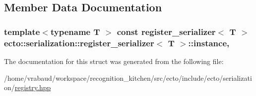 \subsection{Member Data Documentation}
\hypertarget{structecto_1_1serialization_1_1register__serializer_a742ed82697621237f599631009e47e05}{}
\subsubsection[{instance}]{\setlength{\rightskip}{0pt plus 5cm}template$<$typename T $>$ const {\bf register\+\_\+serializer}$<$ T $>$ {\bf ecto\+::serialization\+::register\+\_\+serializer}$<$ T $>$\+::instance\hspace{0.3cm}{\ttfamily [static]}, {\ttfamily [private]}}\label{structecto_1_1serialization_1_1register__serializer_a742ed82697621237f599631009e47e05}


The documentation for this struct was generated from the following file\+:\begin{DoxyCompactItemize}
\item 
/home/vrabaud/workspace/recognition\+\_\+kitchen/src/ecto/include/ecto/serialization/\hyperlink{serialization_2registry_8hpp}{registry.\+hpp}\end{DoxyCompactItemize}
